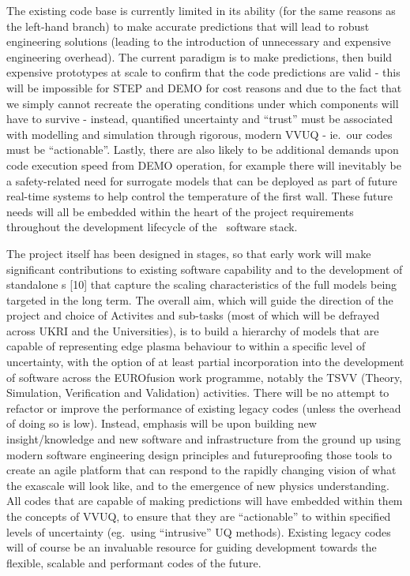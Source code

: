 The existing code base is currently limited in its ability (for the same reasons 
as the left-hand branch) to make accurate predictions that will lead to robust 
engineering solutions (leading to the introduction of unnecessary and expensive 
engineering overhead). The current paradigm is to make predictions, then build 
expensive prototypes at scale to confirm that the code predictions are valid - 
this will be impossible for STEP and DEMO for cost reasons and due to the fact 
that we simply cannot recreate the operating conditions under which components 
will have to survive - instead, quantified uncertainty and ``trust'' must be associated 
with modelling and simulation through rigorous, modern VVUQ - ie.\ our codes must 
be ``actionable''. Lastly, there are also likely to be additional demands upon 
code execution speed from DEMO operation, for example there will inevitably be 
a safety-related need for surrogate models that can be deployed as part of future 
real-time systems to help control the temperature of the first wall. These future 
needs will all be embedded within the heart of the project requirements throughout 
the development lifecycle of the \nep \   software stack. 

The project itself has been designed in stages, so that early work will make significant 
contributions to existing software capability and to the development of standalone 
\papp s  [10] that capture the scaling characteristics of the 
full models being targeted in the long term. The overall aim, which will guide 
the direction of the project and choice of Activites and sub-tasks (most of which 
will be defrayed across UKRI and the Universities), is to build a hierarchy of 
models that are capable of representing edge plasma behaviour to within a specific 
level of uncertainty, with the option of at least partial incorporation into the 
development of software across the EUROfusion work programme, notably the TSVV 
(Theory, Simulation, Verification and Validation) activities. There will be no 
attempt to refactor or improve the performance of existing legacy codes (unless 
the overhead of doing so is low). Instead, emphasis will be upon building new insight/knowledge 
and new software and infrastructure from the ground up using modern software engineering 
design principles and futureproofing those tools to create an agile platform that 
can respond to the rapidly changing vision of what the exascale will look like, 
and to the emergence of new physics understanding. All codes that are capable of 
making predictions will have embedded within them the concepts of VVUQ, to ensure 
that they are ``actionable'' to within specified levels of uncertainty (eg.\ using 
``intrusive'' UQ methods). Existing legacy codes will of course be an invaluable 
resource for guiding development towards the flexible, scalable and performant 
codes of the future.

